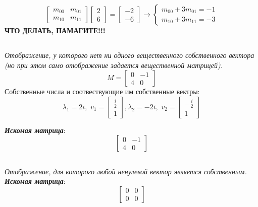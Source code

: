\documentclass[a5paper, 10pt]{article}
\theoremstyle{definition}
\theoremstyle{plain}
\theoremstyle{remark}
\begin{document}
\begin{equation}
\begin{bmatrix}
m_{0 0} & m_{0 1}\\
m_{1 0} & m_{1 1}
\end{bmatrix}
\begin{bmatrix}
2\\
6
\end{bmatrix}
=
\begin{bmatrix}
-2\\
-6
\end{bmatrix}
\to
\begin{cases}
m_{0 0} + 3m_{0 1} = -1\\
m_{1 0} + 3m_{1 1} = -3
\end{cases}
\end{equation}
\textbf{ЧТО ДЕЛАТЬ, ПАМАГИТЕ!!!}

\subsection{}
\textit{Отображение, у которого нет ни одного вещественного собственного вектора (но при этом само отображение задается вещественной матрицей).}\\
\begin{equation}
M =
\begin{bmatrix}
0 & -1\\
4 & 0
\end{bmatrix}
\end{equation}
Собственные числа и соотвествующие им собственные вектры:
\begin{equation}
\lambda_1 = 2i, \, \, 
v_1 = 
\begin{bmatrix}
\frac{i}{2}\\
1
\end{bmatrix}
,
\lambda_2 =- 2i, \, \, 
v_2 = 
\begin{bmatrix}
-\frac{i}{2}\\
1
\end{bmatrix}
\end{equation}

\textit{\textbf{Искомая матрица}}:
\begin{equation}
\begin{bmatrix}
0 & -1\\
4 & 0
\end{bmatrix}
\end{equation}


\subsection{}
\textit{Отображение, для которого любой ненулевой вектор является собственным.}\\

\textit{\textbf{Искомая матрица}}:
\begin{equation}
\begin{bmatrix}
0 & 0\\
0 & 0
\end{bmatrix}
\end{equation}
\end{document}
